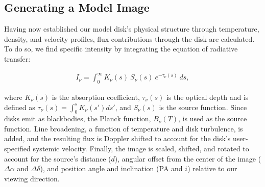 




\subsection{Generating a Model Image}

Having now established our model disk's physical structure through temperature, density, and velocity profiles, flux contributions through the disk are calculated. To do so, we find specific intensity by integrating the equation of radiative transfer:

\begin{align}
  I_\nu = \int_0^{\infty} K_\nu(s)\ S_\nu(s)\ e^{-\tau_\nu(s)}\ ds,
\end{align}

\noindent where $K_\nu(s)$ is the absorption coefficient, $\tau_\nu(s)$ is the optical depth and is defined as $\tau_\nu(s) = \int_0^s K_\nu(s') ds'$, and $S_\nu(s)$ is the source function. Since disks emit as blackbodies, the Planck function, $B_\nu(T)$, is used as the source function. Line broadening, a function of temperature and disk turbulence, is added, and the resulting flux is Doppler shifted to account for the disk's user-specified systemic velocity. Finally, the image is scaled, shifted, and rotated to account for the source's distance ($d$), angular offset from the center of the image ($\Delta \alpha$ and $\Delta \delta$), and position angle and inclination (PA and $i$) relative to our viewing direction.

